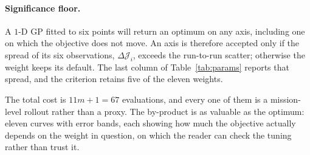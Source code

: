 \documentclass[11pt,a4paper]{article}
\begin{document}
\paragraph{Significance floor.} A $1$-D GP fitted to six points will return an optimum on any axis, including
one on which the objective does not move. An axis is therefore accepted only if the spread of its six
observations, $\Delta\mathcal{J}_i$, exceeds the run-to-run scatter; otherwise the weight keeps its default.
The last column of Table~\ref{tab:params} reports that spread, and the criterion retains five of the eleven
weights.

The total cost is $11m+1=67$ evaluations, and every one of them is a mission-level rollout rather than a
proxy. The by-product is as valuable as the optimum: eleven curves with error bands, each showing how much
the objective actually depends on the weight in question, on which the reader can check the tuning rather
than trust it.
\end{document}
